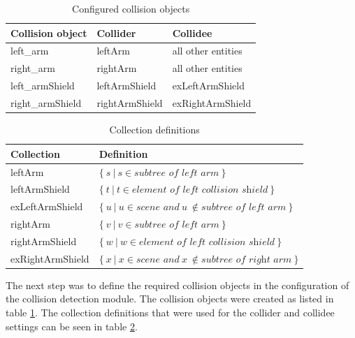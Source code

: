 \begin{table}
  \centering
  \begin{tabular}[htb]{|l|l|l|} \hline
	\textbf{Collision object} & \textbf{Collider} & \textbf{Collidee} \\ \hline
	left\_arm & leftArm & all other entities \\
	right\_arm & rightArm & all other entities \\
	left\_armShield & leftArmShield & exLeftArmShield \\
	right\_armShield & rightArmShield & exRightArmShield \\ \hline
  \end{tabular}
  \caption{Configured collision objects}
  \label{fig:col_groups}
\end{table}
\begin{table}
  \centering
  \begin{tabular}[htb]{|l|l|} \hline
	\textbf{Collection} & \textbf{Definition} \\ \hline
	leftArm & $\{~s~|~s\in\textit{subtree of left arm}~\}$ \\
	leftArmShield & $\{~t~|~t\in\textit{element of left collision shield}~\}$ \\
	exLeftArmShield & $\{~u~|~u\in\textit{scene and}~u~\notin\textit{subtree of left arm}~\}$ \\
	rightArm & $\{~v~|~v\in\textit{subtree of left arm}~\}$ \\
	rightArmShield & $\{~w~|~w\in\textit{element of left collision shield}~\}$ \\
	exRightArmShield & $\{~x~|~x\in\textit{scene and}~x~\notin\textit{subtree of right arm}~\}$ \\ \hline
  \end{tabular}
  \caption{Collection definitions}
  \label{fig:col_defs}
\end{table}
The next step was to define the required collision objects in the configuration of the collision detection module. The collision objects were created as listed in table \ref{fig:col_groups}. The collection definitions that were used for the collider and collidee settings can be seen in table \ref{fig:col_defs}.
